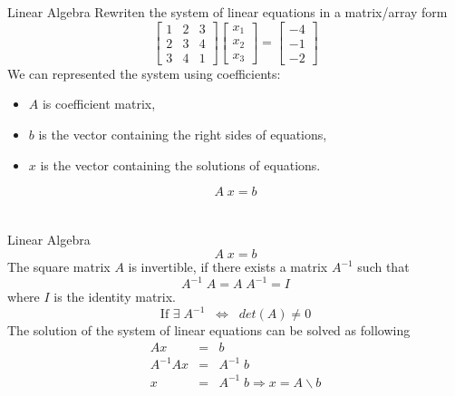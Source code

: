 \documentclass[xcolor=x11names,compress]{beamer}
\renewcommand{\(}{\begin{columns}}
\renewcommand{\)}{\end{columns}}
\newcommand{\<}[1]{\begin{column}{#1}}
\renewcommand{\>}{\end{column}}
\begin{document}
\section{}
\begin{frame}[fragile]{Linear Algebra}
Rewriten the system of linear equations in a matrix/array form
\[\left[\begin{array}{ccc}
 1 & 2 & 3 \\
 2 & 3 & 4\\        
 3 & 4 & 1 
\end{array}\right]
\left[\begin{array}{c}
x_1\\
x_2\\
x_3 
\end{array}\right]
= \left[\begin{array}{c}
-4\\
-1\\
-2 
\end{array}\right]\]
We can represented the system using coefficients:
\begin{itemize}
\item $A$ is coefficient matrix,
\item $b$ is the vector containing the right sides of equations,
\item $x$ is the vector containing the solutions of equations.
\end{itemize}

\begin{equation*}
 A\;x = b
\end{equation*}
\end{frame}
\section{}
\begin{frame}[fragile]{Linear Algebra}
\begin{equation*}
 A\;x = b 
\end{equation*}
The square matrix $A$ is invertible, if there exists a matrix $A^{-1}$ such that
\begin{equation*}
A^{-1}\;A = A\;A^{-1} = I
\end{equation*}
where $I$ is the identity matrix. 
\begin{equation*}
\mbox{If } \exists \; A^{-1} \;\; \Leftrightarrow \;\; det(A) \neq 0
\end{equation*}
The solution of the system of linear equations can be solved as following
\begin{eqnarray*}
 Ax & = & b \\
 A^{-1}A x & = & A^{-1}\;b\\
 x & = & A^{-1}\;b\Rightarrow x = A\backslash b
\end{eqnarray*}
\end{frame}
\end{document}
